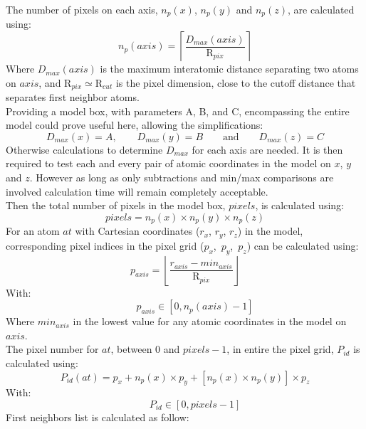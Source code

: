 \documentclass[9pt,tutorial]{livecoms}
\newcommand{\Rc}{\text{R}_{cut}}
\newcommand{\Pc}{\text{R}_{pix}}
\begin{document}
The number of pixels on each axis, $n_{p}(x)$, $n_{p}(y)$ and $n_{p}(z)$, are calculated using:
\begin{equation}
\label{e_npix}
n_{p}(axis) = \left\lceil \frac{D_{max}(axis)}{\Pc} \right\rceil 
\end{equation}
Where $D_{max}(axis)$ is the maximum interatomic distance separating two atoms on $axis$, and $\Pc \simeq \Rc$ is the pixel dimension, close to the cutoff distance that separates first neighbor atoms. \\
Providing a model box, with parameters A, B, and C, encompassing the entire model could prove useful here, allowing the simplifications: 
\begin{equation}
\label{e_dmax}
D_{max}(x) = A,\qquad D_{max}(y) = B\qquad \textrm{and}\qquad D_{max}(z) = C 
\end{equation}
Otherwise calculations to determine $D_{max}$ for each axis are needed. 
It is then required to test each and every pair of atomic coordinates in the model on $x$, $y$ and $z$. 
However as long as only subtractions and min/max comparisons are involved calculation time will remain completely acceptable. \\[0.25cm]
Then the total number of pixels in the model box, $pixels$, is calculated using: 
\begin{equation}
pixels = n_{p}(x) \times n_{p}(y) \times n_{p}(z) 
\end{equation}
For an atom $at$ with Cartesian coordinates ($r_x$, $r_y$, $r_z$) in the model, corresponding pixel indices in the pixel grid ($p_x$,~$p_y$,~$p_z$) can be calculated using:
\begin{equation}
p_{axis} = \left\lfloor \frac{r_{axis} - min_{axis}}{\Pc} \right\rfloor
\end{equation}
With:
\begin{equation}
\qquad p_{axis} \in [0, n_{p}(axis)-1]
\end{equation}
Where $min_{axis}$ in the lowest value for any atomic coordinates in the model on $axis$. \\ 
The pixel number for $at$, between 0 and $pixels-1$, in entire the pixel grid, $P_{id}$ is calculated using:
\begin{equation}
P_{id}(at) = p_{x} + n_{p}(x) \times p_{y} + \left[n_{p}(x) \times n_{p}(y)\right] \times p_{z}
\end{equation}
With:
\begin{equation}
\qquad P_{id} \in [0, pixels-1]
\end{equation}
First neighbors list is calculated as follow:
\end{document}
